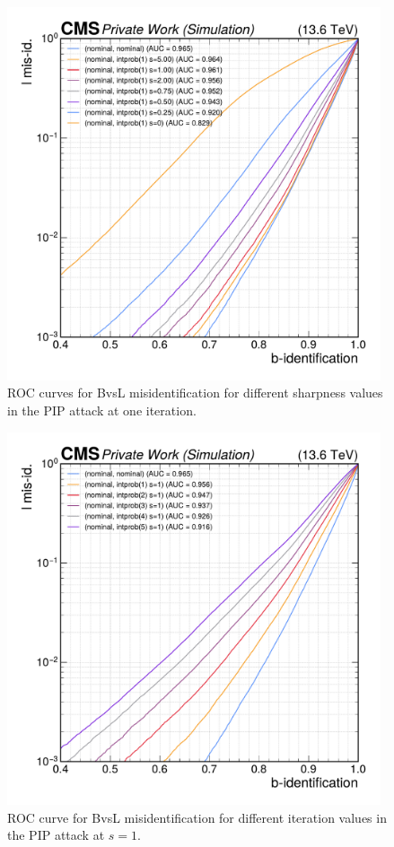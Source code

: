 \begin{figure}[h]
\centering
    \includegraphics[width=11cm]{media/output/roc_bvsl_intprob_sharpness.pdf}
    \caption{ROC curves for BvsL misidentification for different sharpness values in the PIP attack at one iteration.}
    \label{fig:intprob_rocs_vs_sharpness}
\end{figure}

\begin{figure}[h]
\centering
    \includegraphics[width=11cm]{media/output/roc_bvsl_intprob_iterations.pdf}
    \caption{ROC curve for BvsL misidentification for different iteration values in the PIP attack at $s=1$.}
    \label{fig:intprob_rocs_vs_iterations}
\end{figure}

